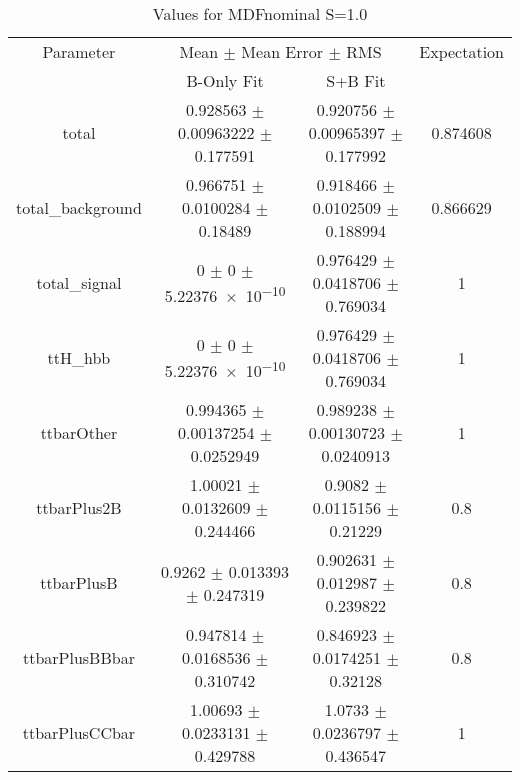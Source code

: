 \begin{table}
\centering
\caption{Values for MDFnominal S=1.0}
\begin{tabular}{cccc}
\toprule
Parameter & \multicolumn{2}{c}{Mean $\pm$ Mean Error $\pm$ RMS} & Expectation\\
 & B-Only Fit & S+B Fit & \\
\midrule
total & \num{0.928563} $\pm$ \num{0.00963222} $\pm$ \num{0.177591} & \num{0.920756} $\pm$ \num{0.00965397} $\pm$ \num{0.177992} & \num{0.874608}\\
total\_background & \num{0.966751} $\pm$ \num{0.0100284} $\pm$ \num{0.18489} & \num{0.918466} $\pm$ \num{0.0102509} $\pm$ \num{0.188994} & \num{0.866629}\\
total\_signal & \num{0} $\pm$ \num{0} $\pm$ \num{5.22376e-10} & \num{0.976429} $\pm$ \num{0.0418706} $\pm$ \num{0.769034} & \num{1}\\
ttH\_hbb & \num{0} $\pm$ \num{0} $\pm$ \num{5.22376e-10} & \num{0.976429} $\pm$ \num{0.0418706} $\pm$ \num{0.769034} & \num{1}\\
ttbarOther & \num{0.994365} $\pm$ \num{0.00137254} $\pm$ \num{0.0252949} & \num{0.989238} $\pm$ \num{0.00130723} $\pm$ \num{0.0240913} & \num{1}\\
ttbarPlus2B & \num{1.00021} $\pm$ \num{0.0132609} $\pm$ \num{0.244466} & \num{0.9082} $\pm$ \num{0.0115156} $\pm$ \num{0.21229} & \num{0.8}\\
ttbarPlusB & \num{0.9262} $\pm$ \num{0.013393} $\pm$ \num{0.247319} & \num{0.902631} $\pm$ \num{0.012987} $\pm$ \num{0.239822} & \num{0.8}\\
ttbarPlusBBbar & \num{0.947814} $\pm$ \num{0.0168536} $\pm$ \num{0.310742} & \num{0.846923} $\pm$ \num{0.0174251} $\pm$ \num{0.32128} & \num{0.8}\\
ttbarPlusCCbar & \num{1.00693} $\pm$ \num{0.0233131} $\pm$ \num{0.429788} & \num{1.0733} $\pm$ \num{0.0236797} $\pm$ \num{0.436547} & \num{1}\\
\bottomrule
\end{tabular}
\end{table}